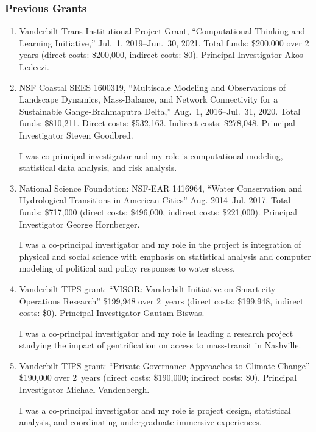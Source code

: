 \subsubsection{Previous Grants}
\begin{enumerate}
%
\item Vanderbilt Trans-Institutional Project Grant,
``Computational Thinking and Learning Initiative,''
Jul.~1, 2019--Jun.~30, 2021.
Total funds: \$200,000 over 2 years (direct costs: \$200,000, indirect costs: \$0).
Principal Investigator Akos Ledeczi.
%
\item NSF Coastal SEES 1600319,
``Multiscale Modeling and Observations of Landscape Dynamics, Mass-Balance, and Network Connectivity for a Sustainable Gange-Brahmaputra Delta,''
Aug.~1, 2016--Jul.~31, 2020.
Total funds: \$810,211. Direct costs: \$532,163. Indirect costs: \$278,048.
Principal Investigator Steven Goodbred.
\begin{credit}
I was co-principal investigator and my role is computational modeling, statistical data analysis, and risk analysis.
\end{credit}
%
%
\item National Science Foundation: NSF-EAR 1416964,
``Water Conservation and Hydrological Transitions in American Cities''
Aug. 2014--Jul. 2017.
Total funds: \$717,000 (direct costs: \$496,000, indirect costs: \$221,000).
Principal Investigator George Hornberger.
\begin{credit}
I was a co-principal investigator and my role in the project is integration of physical and social science with emphasis on statistical analysis and
computer modeling of political and policy responses to water stress.
\end{credit}
%
%
\item Vanderbilt TIPS grant: ``VISOR: Vanderbilt Initiative on Smart-city Operations Research'' \$199,948 over 2~years (direct costs: \$199,948, indirect costs: \$0). Principal Investigator Gautam Biswas.
\begin{credit}
I was a co-principal investigator and my role is leading a research project studying the impact of gentrification on access to mass-transit in Nashville.
\end{credit}
%
%
\item Vanderbilt TIPS grant: ``Private Governance Approaches to Climate Change'' \$190,000 over 2~years (direct costs: \$190,000; indirect costs: \$0). Principal Investigator Michael Vandenbergh.
\begin{credit}
I was a co-principal investigator and my role is project design, statistical analysis, and coordinating undergraduate immersive experiences.

\end{credit}
\end{enumerate}
